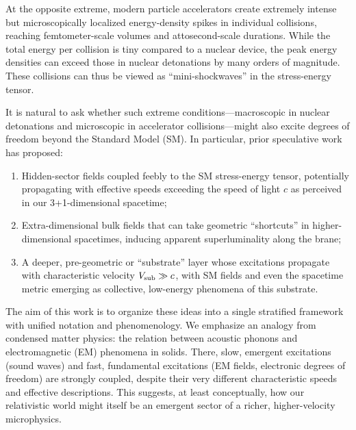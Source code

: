 \documentclass[aps,prd,twocolumn,nofootinbib,superscriptaddress]{revtex4-2}
\begin{document}
At the opposite extreme, modern particle accelerators create extremely intense but microscopically localized energy-density spikes in individual collisions, reaching femtometer-scale volumes and attosecond-scale durations. While the total energy per collision is tiny compared to a nuclear device, the peak energy densities can exceed those in nuclear detonations by many orders of magnitude. These collisions can thus be viewed as ``mini-shockwaves'' in the stress-energy tensor.

It is natural to ask whether such extreme conditions---macroscopic in nuclear detonations and microscopic in accelerator collisions---might also excite degrees of freedom beyond the Standard Model (SM). In particular, prior speculative work has proposed:
\begin{enumerate}
    \item Hidden-sector fields coupled feebly to the SM stress-energy tensor, potentially propagating with effective speeds exceeding the speed of light $c$ as perceived in our 3+1-dimensional spacetime;
    \item Extra-dimensional bulk fields that can take geometric ``shortcuts'' in higher-dimensional spacetimes, inducing apparent superluminality along the brane;
    \item A deeper, pre-geometric or ``substrate'' layer whose excitations propagate with characteristic velocity $V_{\rm sub} \gg c$, with SM fields and even the spacetime metric emerging as collective, low-energy phenomena of this substrate.
\end{enumerate}

The aim of this work is to organize these ideas into a single stratified framework with unified notation and phenomenology. We emphasize an analogy from condensed matter physics: the relation between acoustic phonons and electromagnetic (EM) phenomena in solids. There, slow, emergent excitations (sound waves) and fast, fundamental excitations (EM fields, electronic degrees of freedom) are strongly coupled, despite their very different characteristic speeds and effective descriptions. This suggests, at least conceptually, how our relativistic world might itself be an emergent sector of a richer, higher-velocity microphysics.
\end{document}
